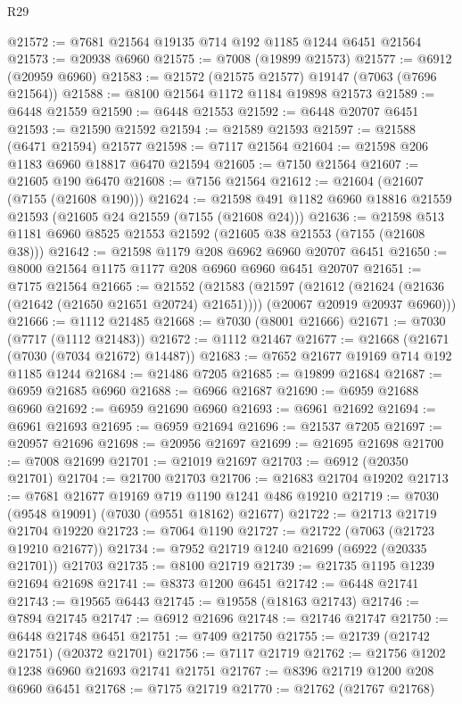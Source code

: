 \begin{lexlean}{R29}
\begin{coremodule}
@21572 := @7681 @21564 @19135 @714 @192 @1185 @1244 @6451 @21564
@21573 := @20938 @6960
@21575 := @7008 (@19899 @21573)
@21577 := @6912 (@20959 @6960)
@21583 := @21572 (@21575 @21577) @19147 (@7063 (@7696 @21564))
@21588 := @8100 @21564 @1172 @1184 @19898 @21573
@21589 := @6448 @21559
@21590 := @6448 @21553
@21592 := @6448 @20707 @6451
@21593 := @21590 @21592
@21594 := @21589 @21593
@21597 := @21588 (@6471 @21594) @21577
@21598 := @7117 @21564
@21604 := @21598 @206 @1183 @6960 @18817 @6470 @21594
@21605 := @7150 @21564
@21607 := @21605 @190 @6470
@21608 := @7156 @21564
@21612 := @21604 (@21607 (@7155 (@21608 @190)))
@21624 := @21598 @491 @1182 @6960 @18816 @21559 @21593 (@21605 @24 @21559 (@7155 (@21608 @24)))
@21636 := @21598 @513 @1181 @6960 @8525 @21553 @21592 (@21605 @38 @21553 (@7155 (@21608 @38)))
@21642 := @21598 @1179 @208 @6962 @6960 @20707 @6451
@21650 := @8000 @21564 @1175 @1177 @208 @6960 @6960 @6451 @20707
@21651 := @7175 @21564
@21665 := @21552
    (@21583
      (@21597
        (@21612 (@21624 (@21636 (@21642 (@21650 @21651 @20724) @21651))))
        (@20067 @20919 @20937 @6960)))
@21666 := @1112 @21485
@21668 := @7030 (@8001 @21666)
@21671 := @7030 (@7717 (@1112 @21483))
@21672 := @1112 @21467
@21677 := @21668 (@21671 (@7030 (@7034 @21672) @14487))
@21683 := @7652 @21677 @19169 @714 @192 @1185 @1244
@21684 := @21486 @7205
@21685 := @19899 @21684
@21687 := @6959 @21685 @6960
@21688 := @6966 @21687
@21690 := @6959 @21688 @6960
@21692 := @6959 @21690 @6960
@21693 := @6961 @21692
@21694 := @6961 @21693
@21695 := @6959 @21694
@21696 := @21537 @7205
@21697 := @20957 @21696
@21698 := @20956 @21697
@21699 := @21695 @21698
@21700 := @7008 @21699
@21701 := @21019 @21697
@21703 := @6912 (@20350 @21701)
@21704 := @21700 @21703
@21706 := @21683 @21704 @19202
@21713 := @7681 @21677 @19169 @719 @1190 @1241 @486 @19210
@21719 := @7030 (@9548 @19091) (@7030 (@9551 @18162) @21677)
@21722 := @21713 @21719 @21704 @19220
@21723 := @7064 @1190
@21727 := @21722 (@7063 (@21723 @19210 @21677))
@21734 := @7952 @21719 @1240 @21699 (@6922 (@20335 @21701)) @21703
@21735 := @8100 @21719
@21739 := @21735 @1195 @1239 @21694 @21698
@21741 := @8373 @1200 @6451
@21742 := @6448 @21741
@21743 := @19565 @6443
@21745 := @19558 (@18163 @21743)
@21746 := @7894 @21745
@21747 := @6912 @21696
@21748 := @21746 @21747
@21750 := @6448 @21748 @6451
@21751 := @7409 @21750
@21755 := @21739 (@21742 @21751) (@20372 @21701)
@21756 := @7117 @21719
@21762 := @21756 @1202 @1238 @6960 @21693 @21741 @21751
@21767 := @8396 @21719 @1200 @208 @6960 @6451
@21768 := @7175 @21719
@21770 := @21762 (@21767 @21768)

\end{coremodule}
\end{lexlean}
